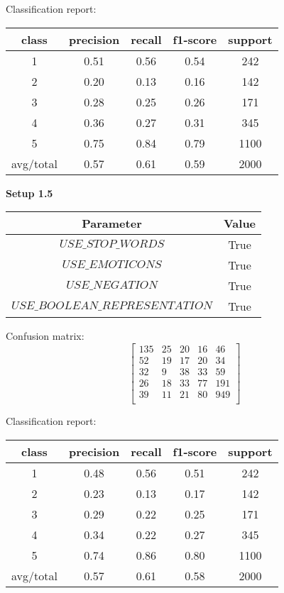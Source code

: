 \documentclass[12pt]{report}
\begin{document}
Classification report:

\begin{center}
	\begin{tabular}{c | c | c | c | c }
		\hline
		class & precision & recall & f1-score & support \\ \hline
		1 & 0.51 & 0.56 & 0.54 & 242 \\ \hline
		2 & 0.20 & 0.13 & 0.16 & 142 \\ \hline
		3 & 0.28 & 0.25 & 0.26 & 171 \\ \hline
		4 & 0.36 & 0.27 & 0.31 & 345 \\ \hline
		5 & 0.75 & 0.84 & 0.79 & 1100 \\ \hline
		avg/total & 0.57 & 0.61 & 0.59 & 2000 \\ \hline
	\end{tabular}
\end{center}


\textbf{Setup 1.5}

\begin{center}
	\begin{tabular}{ c | c }
		\hline
		Parameter & Value \\ \hline
		$USE\_STOP\_WORDS$ & True \\ \hline
		$USE\_EMOTICONS$ & True \\ \hline
		$USE\_NEGATION$ & True \\ \hline
		$USE\_BOOLEAN\_REPRESENTATION$ & True \\ \hline
	\end{tabular}
\end{center}

Confusion matrix:
\[
\begin{bmatrix}
135 & 25 & 20 & 16 & 46 \\
52 & 19 & 17 & 20 & 34 \\
32 &  9 & 38 & 33 & 59 \\
26 & 18 & 33 & 77 & 191 \\
39 & 11 & 21 & 80 & 949 \\
\end{bmatrix}
\]

Classification report:

\begin{center}
	\begin{tabular}{c | c | c | c | c }
		\hline
		class & precision & recall & f1-score & support \\ \hline
		1 & 0.48 & 0.56 & 0.51 & 242 \\ \hline
		2 & 0.23 & 0.13 & 0.17 & 142 \\ \hline
		3 & 0.29 & 0.22 & 0.25 & 171 \\ \hline
		4 & 0.34 & 0.22 & 0.27 & 345 \\ \hline
		5 & 0.74 & 0.86 & 0.80 & 1100 \\ \hline
		avg/total & 0.57 & 0.61 & 0.58 & 2000 \\ \hline
	\end{tabular}
\end{center}
\end{document}
